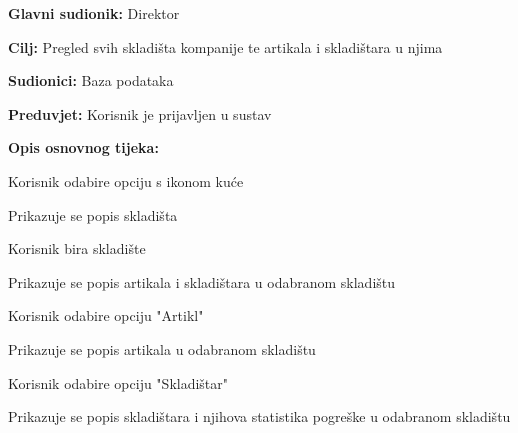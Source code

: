 					
					\noindent {}
					\begin{packed_item}
	
						\item \textbf{Glavni sudionik: }Direktor
						\item  \textbf{Cilj:} Pregled svih skladišta kompanije te artikala i skladištara u njima 
						\item  \textbf{Sudionici:} Baza podataka
						\item  \textbf{Preduvjet:} Korisnik je prijavljen u sustav
						\item  \textbf{Opis osnovnog tijeka:}
						
						\item[] \begin{packed_enum}
							
							\item Korisnik odabire opciju s ikonom kuće
							\item Prikazuje se popis skladišta
							\item Korisnik bira skladište
							\item Prikazuje se popis artikala i skladištara u odabranom skladištu 
							\item Korisnik odabire opciju "Artikl"
							\item Prikazuje se popis artikala u odabranom skladištu 
							\item Korisnik odabire opciju "Skladištar"
							\item Prikazuje se popis skladištara i njihova statistika pogreške u odabranom skladištu 
																												
						\end{packed_enum}
					\end{packed_item}
					
